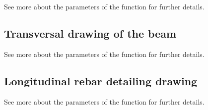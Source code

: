 \documentclass[a4paper,10pt,english]{sphinxmanual}
\begin{document}
\sphinxAtStartPar
See more about the parameters of the {\hyperref[\detokenize{API:etacad.beam.Beam.draw_longitudinal}]{}} function for further details.


\subsection{Transversal drawing of the beam}
\label{\detokenize{usage:transversal-drawing-of-the-beam}}
\begin{sphinxVerbatim}[commandchars=\\\{\}]
\end{sphinxVerbatim}

\sphinxAtStartPar
See more about the parameters of the {\hyperref[\detokenize{API:etacad.beam.Beam.draw_transverse}]{}} function for further details.


\subsection{Longitudinal rebar detailing drawing}
\label{\detokenize{usage:longitudinal-rebar-detailing-drawing}}
\begin{sphinxVerbatim}[commandchars=\\\{\}]
\end{sphinxVerbatim}

\sphinxAtStartPar
See more about the parameters of the {\hyperref[\detokenize{API:etacad.beam.Beam.draw_longitudinal_rebar_detailing}]{}} function for further details.
\end{document}
